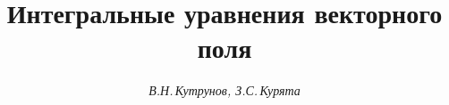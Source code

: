 

 




 


\newcommand{\tts}[1]{} 


 




  


\setcounter{page}{33} 












 


\author{\it В.Н.\,Кутрунов, З.С.\,Курята} 




\title{Интегральные уравнения векторного поля} 


 


\date{} 




\pagestyle{plain} %


 




\maketitle 


\label{begin} 


 


